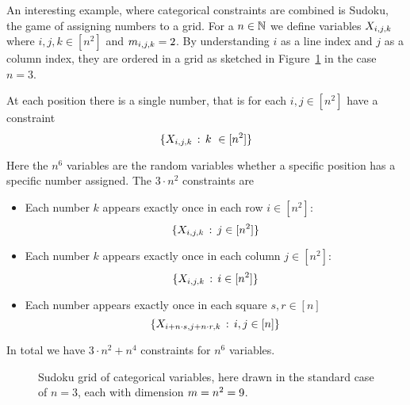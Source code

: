 \begin{example}[Sudoku]
	An interesting example, where categorical constraints are combined is Sudoku, the game of assigning numbers to a grid.
	For a $n\in\mathbb{N}$ we define variables $X_{i,j,k}$ where $i,j,k\in[n^2]$ and $m_{i,j,k}=2$.
	By understanding $i$ as a line index and $j$ as a column index, they are ordered in a grid as sketched in Figure~\ref{fig:sudokuGrid} in the case $n=3$.
	
	
	
	At each position there is a single number, that is for each $i,j\in[n^2]$ have a constraint
		\[ \{\catvariableof{i,j,k} \, : \, k \in [n^2] \} \]
	
	Here the $n^6$ variables are the random variables whether a specific position has a specific number assigned.
	The $3\cdot n^2$ constraints are 
	\begin{itemize}
		\item Each number $k$ appears exactly once in each row $i\in[n^2]$:
			\[ \{X_{i,j,k}  \, : \, j \in [n^2] \} \]
		\item Each number $k$ appears exactly once in each column $j\in[n^2]$:
			\[ \{X_{i,j,k}  \, : \, i \in [n^2] \} \]
		\item Each number appears exactly once in each square $s,r\in[n]$
			\[ \{X_{i+n\cdot s,j+n\cdot r,k}  \, : \, i,j \in [n] \} \]
	\end{itemize}
	
	In total we have $3\cdot n^2 + n^4$ constraints for $n^6$ variables.

	\begin{figure}\label{fig:sudokuGrid} %
	\begin{center}
		
	\end{center}
	\caption{Sudoku grid of categorical variables, here drawn in the standard case of $n=3$, each with dimension $m=n^2=9$.}
	\end{figure}


\end{example}













